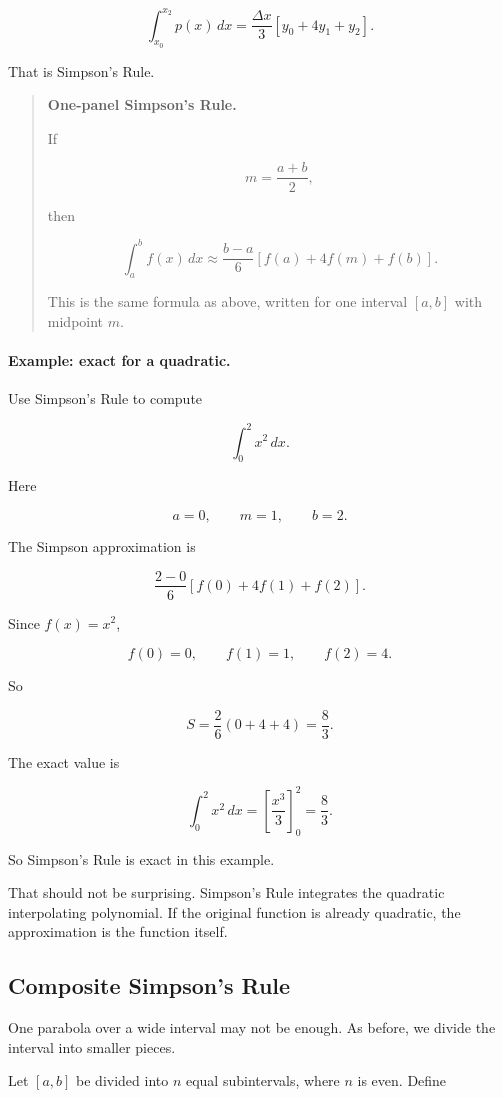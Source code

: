 \[
\int_{x_0}^{x_2}p(x)\,dx
=
\frac{\Delta x}{3}
\left[
y_0+4y_1+y_2
\right].
\]

That is Simpson's Rule.

\begin{quote}
\textbf{One-panel Simpson's Rule.}

If

\[
m=\frac{a+b}{2},
\]

then

\[
\boxed{
\int_a^b f(x)\,dx
\approx
\frac{b-a}{6}\left[
f(a)+4f(m)+f(b)
\right].
}
\]

This is the same formula as above, written for one interval \([a,b]\) with midpoint
\(m\).
\end{quote}

\paragraph{Example: exact for a quadratic.}
Use Simpson's Rule to compute

\[
\int_0^2 x^2\,dx.
\]

Here

\[
a=0,\qquad m=1,\qquad b=2.
\]

The Simpson approximation is

\[
\frac{2-0}{6}\left[f(0)+4f(1)+f(2)\right].
\]

Since \(f(x)=x^2\),

\[
f(0)=0,\qquad f(1)=1,\qquad f(2)=4.
\]

So

\[
S=\frac{2}{6}(0+4+4)=\frac{8}{3}.
\]

The exact value is

\[
\int_0^2 x^2\,dx
=
\left[\frac{x^3}{3}\right]_0^2
=
\frac83.
\]

So Simpson's Rule is exact in this example.

That should not be surprising.  Simpson's Rule integrates the quadratic interpolating
polynomial.  If the original function is already quadratic, the approximation is the
function itself.

\subsection{Composite Simpson's Rule}
\label{subsec:composite-simpsons-rule}

One parabola over a wide interval may not be enough.  As before, we divide the interval
into smaller pieces.

Let \([a,b]\) be divided into \(n\) equal subintervals, where \(n\) is even.  Define

